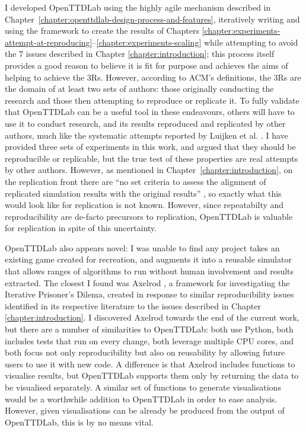 \documentclass[logo,msc,dsti]{style/infthesis}    %
\begin{document}
{I developed OpenTTDLab using the highly agile mechanism described in Chapter~\ref{chapter:openttdlab-design-process-and-features}, iteratively writing and using the framework to create the results of Chapters \ref{chapter:experiments-attempt-at-reproducing}--\ref{chapter:experiments-scaling} while attempting to avoid the 7 issues described in Chapter \ref{chapter:introduction}; this process itself provides a good reason to believe it is fit for purpose and achieves the aims of helping to achieve the 3Rs. However, according to ACM's definitions, the 3Rs are the domain of at least two sets of authors: those originally conducting the research and those then attempting to reproduce or replicate it. To fully validate that OpenTTDLab can be a useful tool in these endeavours, others will have to use it to conduct research, and its results reproduced and replicated by other authors, much like the systematic attempts reported by Luijken et al. \cite{luijken2024replicability}. I have provided three sets of experiments in this work, and argued that they should be reproducible or replicable, but the true test of these properties are real attempts by other authors. However, as mentioned in Chapter~\ref{chapter:introduction}, on the replication front there are ``no set criteria to assess the alignment of replicated simulation results with the original results'' \cite{luijken2024replicability}, so exactly what this would look like for replication is not known. However, since repeatabilty and reproducibility are de-facto precursors to replication, OpenTTDLab is valuable for replication in spite of this uncertainty.

OpenTTDLab also appears novel: I was unable to find any project takes an existing game created for recreation, and augments it into a reusable simulator that allows ranges of algorithms to run without human involvement and results extracted. The closest I found was Axelrod \cite{knight2016open}, a framework for investigating the Iterative Prisoner's Dilema, created in response to similar reproducibility issues identified in its respective literature to the issues described in Chapter \ref{chapter:introduction}. I discovered Axelrod towards the end of the current work, but there are a number of similarities to OpenTTDLab: both use Python, both includes tests that run on every change, both leverage multiple CPU cores, and both focus not only reproducibility but also on reusability by allowing future users to use it with new code. A difference is that Axelrod includes functions to visualise results, but OpenTTDLab supports them only by returning the data to be visualised separately. A similar set of functions to generate visualisations would be a worthwhile addition to OpenTTDLab in order to ease analysis. However, given visualisations can be already be produced from the output of OpenTTDLab, this is by no means vital.

}
\end{document}
